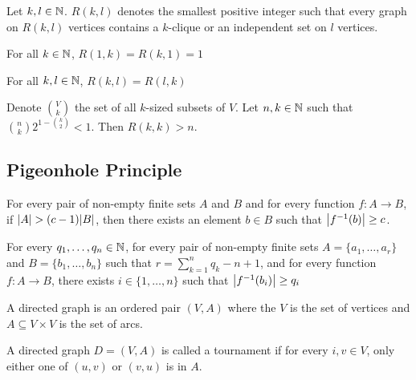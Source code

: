 \documentclass[a4paper]{article}
\begin{document}
\begin{defn} Let $k,l\in\mathbb{N}$. $R(k,l)$ denotes the smallest positive integer such that every graph on $R(k,l)$ vertices contains a $k$-clique or an independent set on $l$ vertices. 
\end{defn}

\begin{prp} For all $k\in\mathbb{N}$, $R(1,k)=R(k,1)=1$
\end{prp}

\begin{prp} For all $k,l\in\mathbb{N}$, $R(k,l)=R(l,k)$
\end{prp}

\begin{thm} Denote $\binom{V}{k}$ the set of all $k$-sized subsets of $V$. Let $n,k\in\mathbb{N}$ such that $\binom{n}{k}2^{1-\binom{k}{2}}<1$. Then $R(k,k)>n$. 
\end{thm}

\subsection{Pigeonhole Principle}
\begin{thm} For every pair of non-empty finite sets $A$ and $B$ and for every function $f:A\to B$, if $\abs{A}>(c-1)\abs{B}$, then there exists an element $b\in B$ such that $\abs{f^{-1}(b)}\geq c$. 
\end{thm}

\begin{thm} For every $q_1,\dots,q_n\in\mathbb{N}$, for every pair of non-empty finite sets $A=\{a_1,\dots,a_r\}$ and $B=\{b_1,\dots,b_n\}$ such that $r=\sum_{k=1}^nq_k-n+1$, and for every function $f:A\to B$, there exists $i\in\{1,\dots,n\}$ such that $\abs{f^{-1}(b_i)}\geq q_i$
\end{thm}









\begin{defn} A directed graph is an ordered pair $(V,A)$ where the $V$ is the set of vertices and $A\subseteq V\times V$ is the set of arcs. 
\end{defn}

\begin{defn}[Tournament] A directed graph $D=(V,A)$ is called a tournament if for every $i,v\in V$, only either one of $(u,v)$ or $(v,u)$ is in $A$. 
\end{defn}
\end{document}
